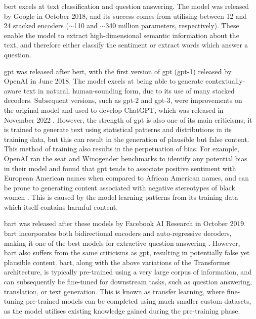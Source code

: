 \acrshort{bert} excels at text classification and question answering. The model was released by Google in October 2018, and its success comes from utilising between 12 and 24 stacked encoders ($\sim$110 and $\sim$340 million parameters, respectively). These enable the model to extract high-dimensional semantic information about the text, and therefore either classify the sentiment or extract words which answer a question.

\acrshort{gpt} was released after \acrshort{bert}, with the first version of \acrshort{gpt} (\acrshort{gpt}-1) released by OpenAI in June 2018. The model excels at being able to generate contextually-aware text in natural, human-sounding form, due to its use of many stacked decoders. Subsequent versions, such as \acrshort{gpt}-2 and \acrshort{gpt}-3, were improvements on the original model and used to develop ChatGPT, which was released in November 2022 \citep{ChatGPTrelease}. However, the strength of \acrshort{gpt} is also one of its main criticisms; it is trained to generate text using statistical patterns and distributions in its training data, but this can result in the generation of plausible but false content. This method of training also results in the perpetuation of bias. For example, OpenAI ran the \acrshort{seat} \citep{may2019measuring} and Winogender \citep{rudinger2018gender} benchmarks to identify any potential bias in their model and found that \acrshort{gpt} tends to associate positive sentiment with European American names when compared to African American names, and can be prone to generating content associated with negative stereotypes of black women \citep{openAIembeddings}. This is caused by the model learning patterns from its training data which itself contains harmful content.

\acrshort{bart} was released after these models by Facebook AI Research in October 2019. \acrshort{bart} incorporates both bidirectional encoders and auto-regressive decoders, making it one of the best models for extractive question answering \citep{pearce2021comparative}. However, \acrshort{bart} also suffers from the same criticisms as \acrshort{gpt}, resulting in potentially false yet plausible content. \acrshort{bart}, along with the above variations of the Transformer architecture, is typically pre-trained using a very large corpus of information, and can subsequently be fine-tuned for downstream tasks, such as question answering, translation, or text generation. This is known as transfer learning, where fine-tuning pre-trained models can be completed using much smaller custom datasets, as the model utilises existing knowledge gained during the pre-training phase.


